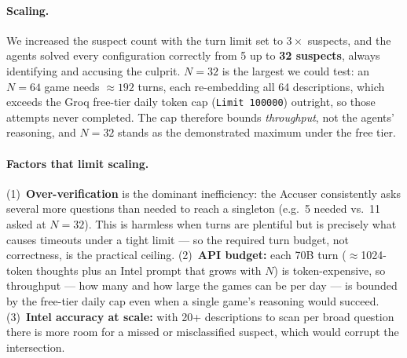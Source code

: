 \documentclass{article}
\begin{document}
\paragraph{Scaling.} We increased the suspect count with the turn limit set to $3\times$
suspects, and the agents solved every configuration correctly from 5 up to \textbf{32
suspects}, always identifying and accusing the culprit. $N{=}32$ is the largest we could
test: an $N{=}64$ game needs $\approx192$ turns, each re-embedding all 64 descriptions, which
exceeds the Groq free-tier daily token cap (\texttt{Limit 100000}) outright, so those
attempts never completed. The cap therefore bounds \emph{throughput}, not the agents'
reasoning, and $N{=}32$ stands as the demonstrated maximum under the free tier.

\paragraph{Factors that limit scaling.} (1)~\textbf{Over-verification} is the dominant
inefficiency: the Accuser consistently asks several more questions than needed to reach a
singleton (e.g.\ 5 needed vs.\ 11 asked at $N{=}32$). This is harmless when turns are
plentiful but is precisely
what causes timeouts under a tight limit --- so the required turn budget, not correctness,
is the practical ceiling. (2)~\textbf{API budget:} each 70B turn ($\approx$1024-token
thoughts plus an Intel prompt that grows with $N$) is token-expensive, so throughput --- how
many and how large the games can be per day --- is bounded by the free-tier daily cap even
when a single game's reasoning would succeed. (3)~\textbf{Intel accuracy at
scale:} with 20+ descriptions to scan per broad question there is more room for a missed or
misclassified suspect, which would corrupt the intersection.
\end{document}
